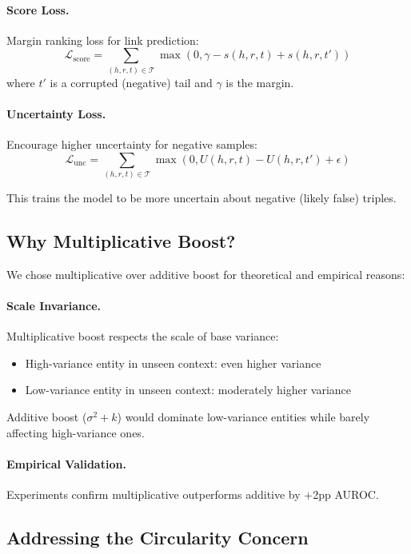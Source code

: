\paragraph{Score Loss.}
Margin ranking loss for link prediction:
\[
\mathcal{L}_\text{score} = \sum_{(h,r,t) \in \mathcal{T}} \max(0, \gamma - s(h,r,t) + s(h,r,t'))
\]
where $t'$ is a corrupted (negative) tail and $\gamma$ is the margin.

\paragraph{Uncertainty Loss.}
Encourage higher uncertainty for negative samples:
\[
\mathcal{L}_\text{unc} = \sum_{(h,r,t) \in \mathcal{T}} \max(0, U(h,r,t) - U(h,r,t') + \epsilon)
\]

This trains the model to be more uncertain about negative (likely false) triples.

\subsection{Why Multiplicative Boost?}

We chose multiplicative over additive boost for theoretical and empirical reasons:

\paragraph{Scale Invariance.}
Multiplicative boost respects the scale of base variance:
\begin{itemize}
    \item High-variance entity in unseen context: even higher variance
    \item Low-variance entity in unseen context: moderately higher variance
\end{itemize}

Additive boost ($\sigma^2 + k$) would dominate low-variance entities while barely affecting high-variance ones.

\paragraph{Empirical Validation.}
Experiments confirm multiplicative outperforms additive by +2pp AUROC.

\subsection{Addressing the Circularity Concern}
\label{sec:circularity}

